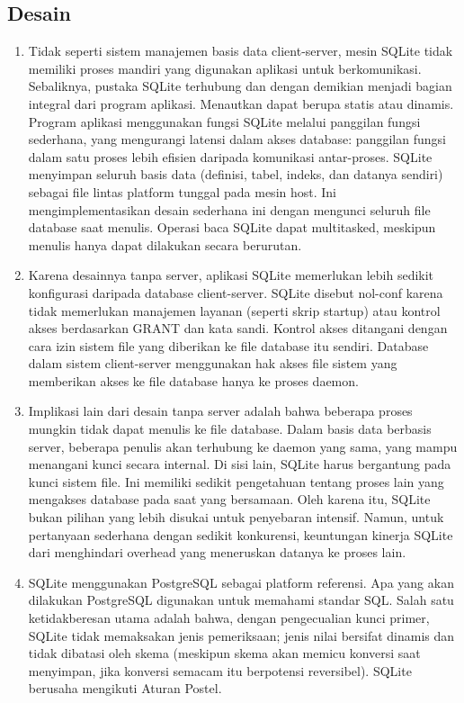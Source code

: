	\subsection{Desain}
		\begin{enumerate}
			\item Tidak seperti sistem manajemen basis data client-server, mesin SQLite tidak memiliki proses mandiri yang digunakan aplikasi untuk berkomunikasi. Sebaliknya, pustaka SQLite terhubung dan dengan demikian menjadi bagian integral dari program aplikasi. Menautkan dapat berupa statis atau dinamis. Program aplikasi menggunakan fungsi SQLite melalui panggilan fungsi sederhana, yang mengurangi latensi dalam akses database: panggilan fungsi dalam satu proses lebih efisien daripada komunikasi antar-proses. SQLite menyimpan seluruh basis data (definisi, tabel, indeks, dan datanya sendiri) sebagai file lintas platform tunggal pada mesin host. Ini mengimplementasikan desain sederhana ini dengan mengunci seluruh file database saat menulis. Operasi baca SQLite dapat multitasked, meskipun menulis hanya dapat dilakukan secara berurutan.
			\item Karena desainnya tanpa server, aplikasi SQLite memerlukan lebih sedikit konfigurasi daripada database client-server. SQLite disebut nol-conf karena tidak memerlukan manajemen layanan (seperti skrip startup) atau kontrol akses berdasarkan GRANT dan kata sandi. Kontrol akses ditangani dengan cara izin sistem file yang diberikan ke file database itu sendiri. Database dalam sistem client-server menggunakan hak akses file sistem yang memberikan akses ke file database hanya ke proses daemon.
			\item Implikasi lain dari desain tanpa server adalah bahwa beberapa proses mungkin tidak dapat menulis ke file database. Dalam basis data berbasis server, beberapa penulis akan terhubung ke daemon yang sama, yang mampu menangani kunci secara internal. Di sisi lain, SQLite harus bergantung pada kunci sistem file. Ini memiliki sedikit pengetahuan tentang proses lain yang mengakses database pada saat yang bersamaan. Oleh karena itu, SQLite bukan pilihan yang lebih disukai untuk penyebaran intensif. Namun, untuk pertanyaan sederhana dengan sedikit konkurensi, keuntungan kinerja SQLite dari menghindari overhead yang meneruskan datanya ke proses lain.
			\item SQLite menggunakan PostgreSQL sebagai platform referensi. Apa yang akan dilakukan PostgreSQL digunakan untuk memahami standar SQL. Salah satu ketidakberesan utama adalah bahwa, dengan pengecualian kunci primer, SQLite tidak memaksakan jenis pemeriksaan; jenis nilai bersifat dinamis dan tidak dibatasi oleh skema (meskipun skema akan memicu konversi saat menyimpan, jika konversi semacam itu berpotensi reversibel). SQLite berusaha mengikuti Aturan Postel.
		\end{enumerate}
		
